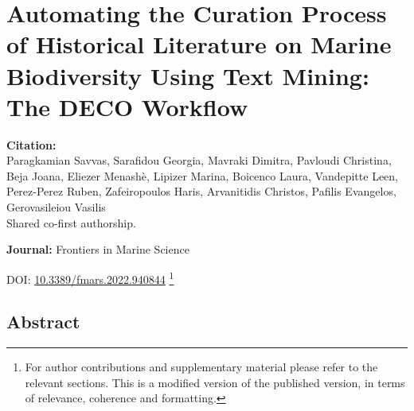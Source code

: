 % 
% 


\chapter{Automating the Curation Process of Historical Literature on Marine Biodiversity Using Text Mining: The DECO Workflow}
\label{cha:deco}


\textbf{Citation:} \\ 
Paragkamian Savvas, Sarafidou Georgia, Mavraki Dimitra, Pavloudi Christina,
Beja Joana, Eliezer Menashè, Lipizer Marina, Boicenco Laura, Vandepitte Leen,
Perez-Perez Ruben, Zafeiropoulos Haris, Arvanitidis Christos, Pafilis Evangelos, Gerovasileiou Vasilis\\

Shared co-first authorship.

\textbf{Journal:} Frontiers in Marine Science

DOI: \href{https://www.frontiersin.org/articles/10.3389/fmars.2022.940844}{10.3389/fmars.2022.940844} \footnote{For author contributions and supplementary material please refer 
    to the relevant sections. This is a modified version of the published 
    version, in terms of relevance, coherence and formatting.}


\section{Abstract}

